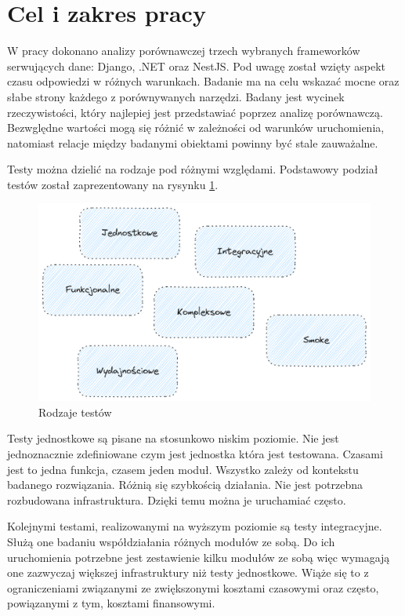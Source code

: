\section{Cel i zakres pracy}

W pracy dokonano analizy porównawczej trzech wybranych frameworków serwujących dane: Django, .NET oraz NestJS.
Pod uwagę został wzięty aspekt czasu odpowiedzi w różnych warunkach.
Badanie ma na celu wskazać mocne oraz słabe strony każdego z porównywanych narzędzi.
Badany jest wycinek rzeczywistości, który najlepiej jest przedstawiać poprzez analizę porównawczą.
Bezwględne wartości mogą się różnić w zależności od warunków uruchomienia, natomiast relacje między badanymi obiektami powinny być stale zauważalne.


Testy można dzielić na rodzaje pod różnymi względami. 
Podstawowy podział testów został zaprezentowany na rysynku \ref{rys:test-types}\cite{atlassianRneRodzaje}.
\begin{figure}[!hb]
	\centering \includegraphics[width=1\linewidth]{rysunki/test-types.png}
	\caption{Rodzaje testów}
	\label{rys:test-types}
\end{figure}
Testy jednostkowe są pisane na stosunkowo niskim poziomie.
Nie jest jednoznacznie zdefiniowane czym jest jednostka która jest testowana.
Czasami jest to jedna funkcja, czasem jeden moduł.
Wszystko zależy od kontekstu badanego rozwiązania.
Różnią się szybkością działania.
Nie jest potrzebna rozbudowana infrastruktura.
Dzięki temu można je uruchamiać często.

Kolejnymi testami, realizowanymi na wyższym poziomie są testy integracyjne.
Służą one badaniu współdziałania różnych modułów ze sobą. 
Do ich uruchomienia potrzebne jest zestawienie kilku modułów ze sobą więc wymagają one zazwyczaj większej infrastruktury niż testy jednostkowe.
Wiąże się to z ograniczeniami związanymi ze zwiększonymi kosztami czasowymi oraz często, powiązanymi z tym, kosztami finansowymi.

